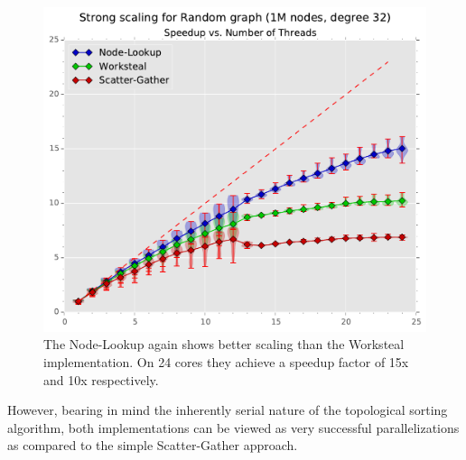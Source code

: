 \begin{figure}[ht]
	\centering
	\includegraphics[width=\columnwidth]{plots/strongscaling_gtRANDOMLIN_n1000000_deg32.pdf}
	\caption{The Node-Lookup again shows better scaling than the Worksteal implementation. On 24 cores they achieve a speedup factor of 15x and 10x respectively.}
	\label{fig:strongscaling}
\end{figure}
%
However, bearing in mind the inherently serial nature of the topological sorting algorithm, both implementations can be viewed as very successful parallelizations as compared to the simple Scatter-Gather approach.



